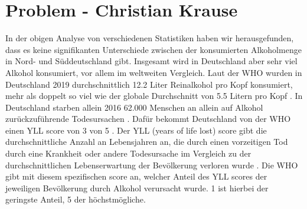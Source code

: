 \documentclass[12pt]{article}
\begin{document}
\section{Problem \footnotesize{- Christian Krause}}
In der obigen Analyse von verschiedenen Statistiken haben wir herausgefunden, dass es keine signifikanten Unterschiede zwischen der konsumierten Alkoholmenge in Nord- und Süddeutschland gibt. Insgesamt wird in Deutschland aber sehr viel Alkohol konsumiert, vor allem im weltweiten Vergleich. Laut der WHO wurden in Deutschland 2019 durchschnittlich 12.2 Liter Reinalkohol pro Kopf konsumiert, mehr als doppelt so viel wie der globale Durchschnitt von 5.5 Litern pro Kopf \autocite{noauthor_alcohol_nodate-1}. In Deutschland starben allein 2016 62.000 Menschen an allein auf Alkohol zurückzuführende Todesursachen \autocite{noauthor_alkoholkonsum_nodate}. Dafür bekommt Deutschland von der WHO einen YLL score von 3 von 5 \autocite{noauthor_alcohol-attributable_nodate}. Der YLL (years of life lost) score gibt die durchschnittliche Anzahl an Lebensjahren an, die durch einen vorzeitigen Tod durch eine Krankheit oder andere Todesursache im Vergleich zu der durchschnittlichen Lebenserwartung der Bevölkerung verloren wurde \autocite[1368]{martinez_reflection_2019}. Die WHO gibt mit diesem spezifischen score an, welcher Anteil des YLL scores der jeweiligen Bevölkerung durch Alkohol verursacht wurde. 1 ist hierbei der geringste Anteil, 5 der höchstmögliche.\\
\end{document}

